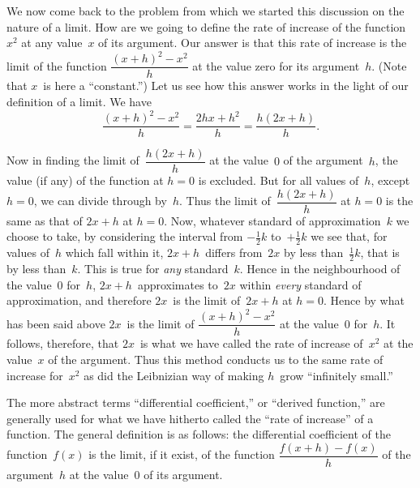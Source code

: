 \documentclass[12pt,leqno]{book}[2005/09/16]
\newcommand{\Chg}[2]{#2}
\newcommand{\Add}[1]{\Chg{}{#1}}
\newcommand{\PageSep}[1]{\ignorespaces}
\begin{document}
We now come back to the problem from
which we started this discussion on the nature
of a limit. How are we going to define the
rate of increase of the function~$x^{2}$ at any
value~$x$ of its argument. Our answer is that
this rate of increase is the limit of the function
$\dfrac{(x + h)^{2} - x^{2}}{h}$ at the value zero for its
argument~$h$. (Note that $x$~is here a ``constant.'')
Let us see how this answer works
\PageSep{233}
in the light of our definition of a limit. We
have
\[
\frac{(x + h)^{2} - x^{2}}{h}
  = \frac{2hx + h^{2}}{h}
  = \frac{h(2x + h)}{h}\Add{.}
\]

Now in finding the limit of~$\dfrac{h(2x + h)}{h}$ at the
value~$0$ of the argument~$h$, the value (if any)
of the function at $h = 0$ is excluded. But for
all values of~$h$, except $h = 0$, we can divide
through by~$h$. Thus the limit of~$\dfrac{h(2x + h)}{h}$ at
$h = 0$ is the same as that of $2x + h$ at $h = 0$.
Now, whatever standard of approximation~$k$
we choose to take, by considering the interval
from $-\frac{1}{2}k$ to~$+\frac{1}{2}k$ we see that, for values of~$h$
which fall within it, $2x + h$~differs from~$2x$
by less than~$\frac{1}{2}k$, that is by less than~$k$. This
is true for \emph{any} standard~$k$. Hence in the neighbourhood
of the value~$0$ for~$h$, $2x + h$~approximates
to~$2x$ within \emph{every} standard of approximation,
and therefore $2x$~is the limit of~$2x + h$
at $h = 0$. Hence by what has been said above
$2x$~is the limit of $\dfrac{(x + h)^{2} - x^{2}}{h}$ at the value~$0$
for~$h$. It follows, therefore, that $2x$~is what
we have called the rate of increase of~$x^{2}$ at
the value~$x$ of the argument. Thus this
method conducts us to the same rate of increase
\PageSep{234}
for~$x^{2}$ as did the Leibnizian way of
making $h$~grow ``infinitely small.''

The more abstract terms ``differential coefficient,''
%
or ``derived function,'' are generally
%
used for what we have hitherto called the
``rate of increase'' of a function. The
general definition is as follows: the differential
coefficient of the function~$f(x)$ is the
limit, if it exist, of the function $\dfrac{f(x + h) - f(x)}{h}$
of the argument~$h$ at the value~$0$ of its argument.
\end{document}
